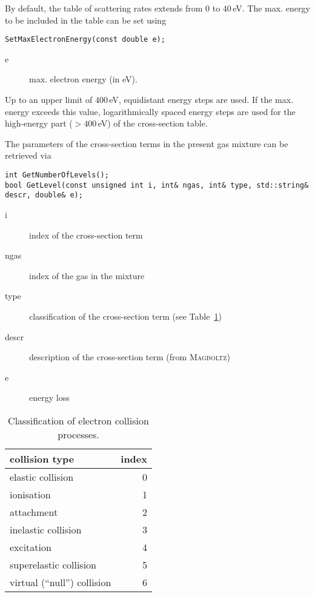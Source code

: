 By default, the table of scattering rates extends from 0 to 40\,eV. 
The max. energy to be included in the table can be set using
\begin{lstlisting}
SetMaxElectronEnergy(const double e);
\end{lstlisting}
\begin{description}
\item[e]
  max. electron energy (in eV).
\end{description}
Up to an upper limit of 400\,eV, equidistant energy steps are used.
If the max. energy exceeds this value, logarithmically spaced 
energy steps are used for the high-energy part ($>400$\,eV) 
of the cross-section table.

The parameters of the cross-section terms in the present gas mixture 
can be retrieved via
\begin{lstlisting}
int GetNumberOfLevels();
bool GetLevel(const unsigned int i, int& ngas, int& type, std::string& descr, double& e);
\end{lstlisting}
\begin{description}
  \item[i] index of the cross-section term
  \item[ngas] index of the gas in the mixture
  \item[type] classification of the cross-section term 
              (see Table~\ref{Tab:ElectronCollisionType})
  \item[descr] description of the cross-section term (from \textsc{Magboltz})
  \item[e] energy loss
\end{description}

\begin{table}
  \centering
  \caption{Classification of electron collision processes.}
  \label{Tab:ElectronCollisionType}
  \begin{tabular}{l r}
    \toprule
    collision type         & index \\
    \midrule
    elastic collision      & 0  \\
    ionisation             & 1  \\
    attachment             & 2  \\
    inelastic collision    & 3  \\
    excitation             & 4  \\
    superelastic collision & 5  \\
    virtual (``null'') collision & 6 \\
    \bottomrule
  \end{tabular}
\end{table}

